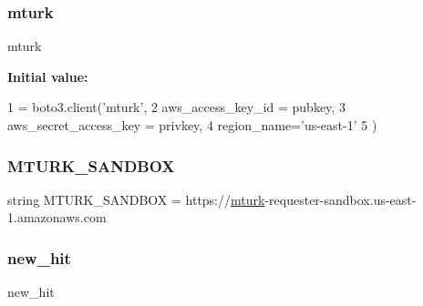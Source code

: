 \mbox{\label{namespacecreate__tasks_a5d236ec2d0fb7be80dec953c4f7564d7}} 
\subsubsection{\texorpdfstring{mturk}{mturk}}
{\footnotesize\ttfamily mturk}

{\bfseries Initial value\+:}
\begin{DoxyCode}
1 =  boto3.client(\textcolor{stringliteral}{'mturk'},
2   aws\_access\_key\_id = pubkey,
3   aws\_secret\_access\_key = privkey,
4   region\_name=\textcolor{stringliteral}{'us-east-1'}
5 )
\end{DoxyCode}
\mbox{\label{namespacecreate__tasks_ae62b2c698fe34f48fcc67433b6495a00}} 
\subsubsection{\texorpdfstring{M\+T\+U\+R\+K\+\_\+\+S\+A\+N\+D\+B\+OX}{MTURK\_SANDBOX}}
{\footnotesize\ttfamily string M\+T\+U\+R\+K\+\_\+\+S\+A\+N\+D\+B\+OX = \textquotesingle{}https\+://\hyperlink{namespacecreate__tasks_a5d236ec2d0fb7be80dec953c4f7564d7}{mturk}-\/requester-\/sandbox.\+us-\/east-\/1.amazonaws.\+com\textquotesingle{}}

\mbox{\label{namespacecreate__tasks_ae1d9786f8e61a0b5b2060dfc938cad0a}} 
\subsubsection{\texorpdfstring{new\+\_\+hit}{new\_hit}}
{\footnotesize\ttfamily new\+\_\+hit}

